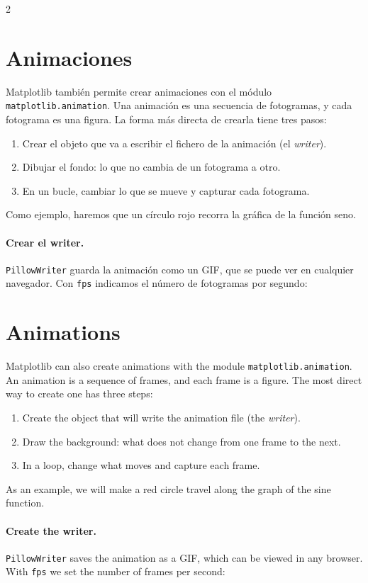\begin{paracol}{2}
\section{Animaciones}
Matplotlib también permite crear animaciones con el módulo \texttt{matplotlib.animation}. Una animación es una secuencia de fotogramas, y cada fotograma es una figura. La forma más directa de crearla tiene tres pasos:
\begin{enumerate}
    \item Crear el objeto que va a escribir el fichero de la animación (el \emph{writer}).
    \item Dibujar el fondo: lo que no cambia de un fotograma a otro.
    \item En un bucle, cambiar lo que se mueve y capturar cada fotograma.
\end{enumerate}
Como ejemplo, haremos que un círculo rojo recorra la gráfica de la función seno.

\paragraph{Crear el writer.} \texttt{PillowWriter} guarda la animación como un GIF, que se puede ver en cualquier navegador. Con \texttt{fps} indicamos el número de fotogramas por segundo:
\switchcolumn
\section{Animations}
Matplotlib can also create animations with the module \texttt{matplotlib.animation}. An animation is a sequence of frames, and each frame is a figure. The most direct way to create one has three steps:
\begin{enumerate}
    \item Create the object that will write the animation file (the \emph{writer}).
    \item Draw the background: what does not change from one frame to the next.
    \item In a loop, change what moves and capture each frame.
\end{enumerate}
As an example, we will make a red circle travel along the graph of the sine function.

\paragraph{Create the writer.} \texttt{PillowWriter} saves the animation as a GIF, which can be viewed in any browser. With \texttt{fps} we set the number of frames per second:
\end{paracol}
